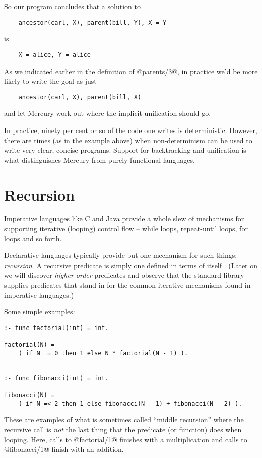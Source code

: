 So our program concludes that a solution to
\begin{verbatim}
    ancestor(carl, X), parent(bill, Y), X = Y
\end{verbatim}
is
\begin{verbatim}
    X = alice, Y = alice
\end{verbatim}
As we indicated earlier in the definition of @parents/3@, in
practice we'd be more likely to write the goal as just
\begin{verbatim}
    ancestor(carl, X), parent(bill, X)
\end{verbatim}
and let Mercury work out where the implicit unification should
go.


In practice, ninety per cent or so of the code one writes is
deterministic.  However, there are times (as in the example above) when
non-determinism can be used to write very clear, concise programs.
Support for backtracking and unification is what distinguishes Mercury
from purely functional languages.

\section{Recursion}

Imperative languages like C and Java provide a whole slew of
mechanisms for supporting iterative (looping) control flow --
while loops, repeat-until loops, for loops and so forth.

Declarative languages typically provide but one mechanism for
such things: \emph{recursion}.  A recursive predicate is simply one
defined in terms of itself .  (Later on we will discover \emph{higher order} predicates
and observe that the standard library supplies predicates that stand in
for the common iterative mechanisms found in imperative languages.)

Some simple examples:
\begin{verbatim}
:- func factorial(int) = int.

factorial(N) =
    ( if N  = 0 then 1 else N * factorial(N - 1) ).


:- func fibonacci(int) = int.

fibonacci(N) =
    ( if N =< 2 then 1 else fibonacci(N - 1) + fibonacci(N - 2) ).
\end{verbatim}
These are examples of what is sometimes called ``middle
recursion'' where the recursive call is \emph{not} the last thing
that the predicate (or function) does when looping.  Here,
calls to @factorial/1@ finishes with a multiplication and calls
to @fibonacci/1@ finish with an addition.

